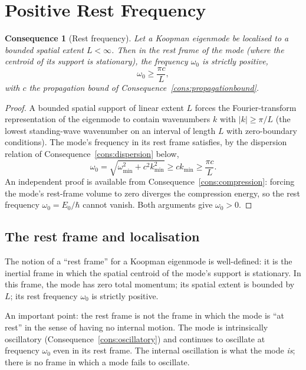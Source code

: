 \documentclass[11pt,twocolumn,a4paper]{article}
\theoremstyle{axiomstyle}
\theoremstyle{conseqstyle}
\newtheorem{consequence}{Consequence}
\theoremstyle{definition}
\theoremstyle{remark}
\begin{document}
\section{Positive Rest Frequency}
\label{sec:restfreq}

\begin{consequence}[Rest frequency]
\label{cons:restfreq}
Let a Koopman eigenmode be localised to a bounded spatial extent $L<\infty$. Then in the rest frame of the mode (where the centroid of its support is stationary), the frequency $\omega_{0}$ is strictly positive,
\begin{equation}
\omega_{0}\ge \frac{\pi c}{L},
\label{eq:restfreqbound}
\end{equation}
with $c$ the propagation bound of Consequence~\ref{cons:propagationbound}.
\end{consequence}

\begin{proof}
A bounded spatial support of linear extent $L$ forces the Fourier-transform representation of the eigenmode to contain wavenumbers $k$ with $|k|\ge\pi/L$ (the lowest standing-wave wavenumber on an interval of length $L$ with zero-boundary conditions). The mode's frequency in its rest frame satisfies, by the dispersion relation of Consequence~\ref{cons:dispersion} below,
\begin{equation*}
\omega_{0}=\sqrt{\omega_{\min}^{2}+c^{2}k_{\min}^{2}}\ge ck_{\min}\ge\frac{\pi c}{L}.
\end{equation*}
An independent proof is available from Consequence~\ref{cons:compression}: forcing the mode's rest-frame volume to zero diverges the compression energy, so the rest frequency $\omega_{0}=E_{0}/\hbar$ cannot vanish. Both arguments give $\omega_{0}>0$.
\end{proof}

\subsection{The rest frame and localisation}

The notion of a ``rest frame'' for a Koopman eigenmode is well-defined: it is the inertial frame in which the spatial centroid of the mode's support is stationary. In this frame, the mode has zero total momentum; its spatial extent is bounded by $L$; its rest frequency $\omega_{0}$ is strictly positive.

An important point: the rest frame is not the frame in which the mode is ``at rest'' in the sense of having no internal motion. The mode is intrinsically oscillatory (Consequence~\ref{cons:oscillatory}) and continues to oscillate at frequency $\omega_{0}$ even in its rest frame. The internal oscillation is what the mode \emph{is}; there is no frame in which a mode fails to oscillate.
\end{document}
